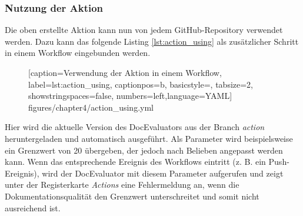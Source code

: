 \subsubsection{Nutzung der Aktion}

Die oben erstellte Aktion kann nun von jedem GitHub-Repository verwendet werden. Dazu kann das folgende Listing \ref{lst:action_using} als zusätzlicher Schritt in einem Workflow eingebunden werden. 
\begin{figure} [htbp]

[caption={Verwendung der Aktion in einem Workflow},
label={lst:action_using},
captionpos=b, basicstyle=\footnotesize, tabsize=2, showstringspaces=false,  numbers=left,language=YAML]
{figures/chapter4/action_using.yml}
\end{figure}

Hier wird die aktuelle Version des DocEvaluators aus der Branch \textit{action} heruntergeladen und automatisch ausgeführt. Als Parameter wird beispielsweise ein Grenzwert von 20 übergeben, der jedoch nach Belieben angepasst werden kann. Wenn das entsprechende Ereignis des Workflows eintritt (z. B. ein Push-Ereignis), wird der DocEvaluator mit diesem Parameter aufgerufen und zeigt unter der Registerkarte \textit{Actions} eine Fehlermeldung an, wenn die Dokumentationsqualität den Grenzwert unterschreitet und somit nicht ausreichend ist.
\begin{comment}
Das Tool \textit{create\_conf}, das im Hauptverzeichnis im GitHub-Repository liegt, kann ein Workflow erstellen, indem \textit{node create\_conf.js --out PATH --type yaml} aufgerufen wird. Dieses kleine Hilfstool erzeugt dann ein beispielhafter Workflow mit allen Eingaben in dem angegebenen Pfad, um es leicht in GitHub einzubinden.
\end{comment}
